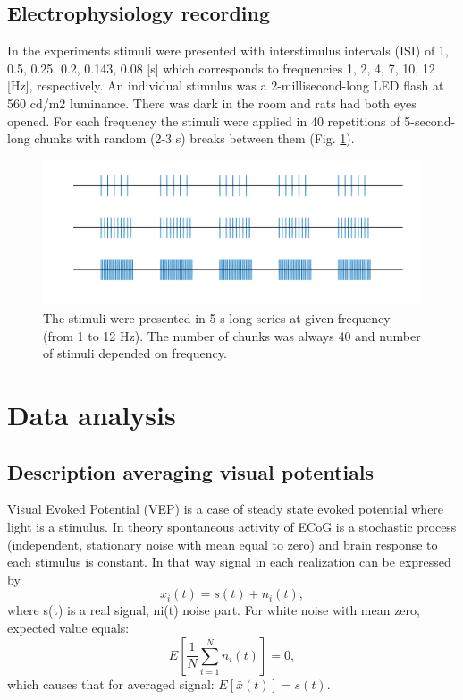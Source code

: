 \documentclass{pracalicmgr}
\begin{document}
 	\section{Electrophysiology recording}
 	In the experiments stimuli were presented with interstimulus intervals (ISI) of  1, 0.5, 0.25, 0.2, 0.143, 0.08 [s] which corresponds to frequencies 1, 2, 4, 7, 10, 12 [Hz], respectively. An individual stimulus was a 2-millisecond-long LED flash at 560 cd/m2 luminance. There was dark in the room and rats had both eyes opened. For each frequency the stimuli were applied in 40 repetitions of 5-second-long chunks with random (2-3 s) breaks between them (Fig. \ref{rys:stimuli}).
 	\begin{figure}[htbp]
 		\begin{center}
 			\includegraphics[scale=0.5]{stimuli.png}
 		\end{center}
 		\caption{ The stimuli were presented in 5 s long series at given frequency (from 1 to 12 Hz). The number of chunks was always 40 and number of stimuli depended on frequency.}
 		\label{rys:stimuli}
 	\end{figure} 

    \chapter{Data analysis}
    \section{Description averaging visual potentials}
    Visual Evoked Potential (VEP) is a case of steady state evoked potential where light is a stimulus. In theory spontaneous activity of ECoG is a stochastic process (independent, stationary noise with mean equal to zero) and brain response to each stimulus is constant. In that way signal in each realization can be expressed by  
    \begin{equation}
    x_i(t) = s(t) + n_i(t),
    \end{equation}
    where s(t) is a real signal, ni(t) noise part. For white noise with mean zero, expected value equals:
    \begin{equation}
    E\left[ \frac{1}{N}\sum_{i=1}^{N} n_i(t)\right] = 0, 
    \end{equation}
    which causes that for averaged signal: $E\left[ \bar{x}(t) \right] = s(t).$
    
\end{document}
